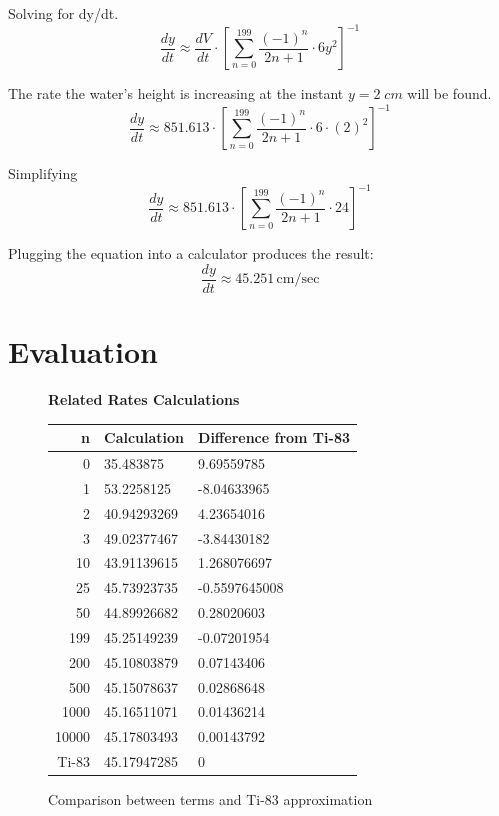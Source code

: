 \documentclass[12pt, titlepage]{article}
\begin{document}
Solving for dy/dt.
\begin{equation*}
  \frac{dy}{dt} \approx \frac{dV}{dt} \cdot [\sum_{n=0}^{199}{ \frac{(-1)^n}{2n+1} }  \cdot 6y^{2}]^{-1}
\end{equation*}

The rate the water's height is increasing at the instant \(y = 2 \; cm\) will be found.
\begin{equation*}
  \frac{dy}{dt} \approx 851.613 \cdot  [\sum_{n=0}^{199}{ \frac{(-1)^n}{2n+1} }  \cdot 6 \cdot (2)^{2}]^{-1}
\end{equation*}

Simplifying
\begin{equation*}
  \frac{dy}{dt} \approx 851.613 \cdot  [\sum_{n=0}^{199}{ \frac{(-1)^n}{2n+1} }  \cdot 24]^{-1}
\end{equation*}

Plugging the equation into a calculator produces the result:
\begin{equation*}
  \frac{dy}{dt} \approx 45.251 \,\textrm{cm/sec}
\end{equation*}

\section{Evaluation}
\begin{figure}[H]
\begin{center}
  \textbf{Related Rates Calculations} \par \medskip
  \begin{tabular}{rll}
  n & Calculation & Difference from Ti-83\\
  \hline
    0 & 35.483875 & 9.69559785\\
  1 & 53.2258125 & -8.04633965\\
  2 & 40.94293269 & 4.23654016\\
  3 & 49.02377467 & -3.84430182\\
  10 & 43.91139615 & 1.268076697 \\
  25 & 45.73923735 & -0.5597645008 \\ 
  50 & 44.89926682& 0.28020603\\
  199 & 45.25149239 &-0.07201954 \\
  200 &  45.10803879& 0.07143406\\
  500 & 45.15078637 & 0.02868648\\
  1000 & 45.16511071 & 0.01436214\\
  10000 & 45.17803493 & 0.00143792\\
  \hline
  Ti-83 & 45.17947285  & 0\\
  \end{tabular}
	\caption{Comparison between terms and Ti-83 approximation}
\end{center}
\end{figure}
\end{document}
